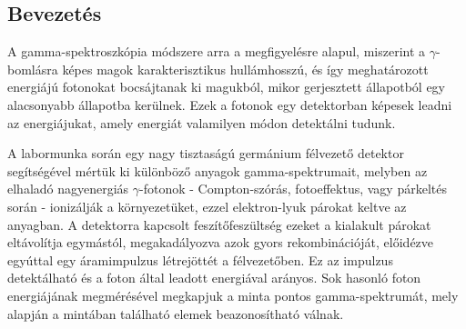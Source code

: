 \begin{multicols}{2}
\section{Bevezetés}
A gamma-spektroszkópia módszere arra a megfigyelésre alapul, miszerint a $\gamma$-bomlásra képes magok karakterisztikus hullámhosszú, és így meghatározott energiájú fotonokat bocsájtanak ki magukból, mikor gerjesztett állapotból egy alacsonyabb állapotba kerülnek. Ezek a fotonok egy detektorban képesek leadni az energiájukat, amely energiát valamilyen módon detektálni tudunk. \par
A labormunka során egy nagy tisztaságú germánium félvezető detektor segítségével mértük ki különböző anyagok gamma-spektrumait, melyben az elhaladó nagyenergiás $\gamma$-fotonok - Compton-szórás, fotoeffektus, vagy párkeltés során - ionizálják a környezetüket, ezzel elektron-lyuk párokat keltve az anyagban. A detektorra kapcsolt feszítőfeszültség ezeket a kialakult párokat eltávolítja egymástól, megakadályozva azok gyors rekombinációját, előidézve egyúttal egy áramimpulzus létrejöttét a félvezetőben. Ez az impulzus detektálható és a foton által leadott energiával arányos. Sok hasonló foton energiájának megmérésével megkapjuk a minta pontos gamma-spektrumát, mely alapján a mintában található elemek beazonosítható válnak.



\end{multicols}

